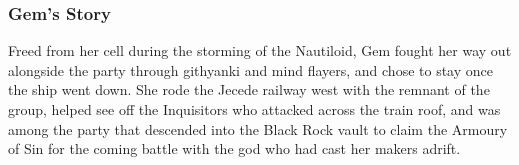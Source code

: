 \subsubsection{Gem's Story}

Freed from her cell during the storming of the Nautiloid, Gem fought her way out alongside the party through githyanki and mind flayers, and chose to stay once the ship went down. She rode the Jecede railway west with the remnant of the group, helped see off the Inquisitors who attacked across the train roof, and was among the party that descended into the Black Rock vault to claim the Armoury of Sin for the coming battle with the god who had cast her makers adrift.

\clearpage
